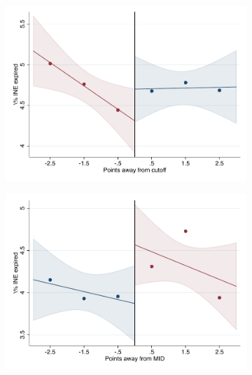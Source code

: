 \documentclass[oneside,11pt]{article}
\begin{document}
\begin{figure}[H]
\begin{center}
    \begin{subfigure}{0.475\textwidth}
        \centering
        \includegraphics[width=\textwidth]{04_Figures/rd_plot_tau_Expired_INE_IPN3.pdf}
    \end{subfigure}
    \begin{subfigure}{0.475\textwidth}
        \centering
        \includegraphics[width=\textwidth]{04_Figures/rd_plot_mid_Expired_INE_IPN3.pdf}
    \end{subfigure}


\end{center}
\end{figure}
\end{document}
